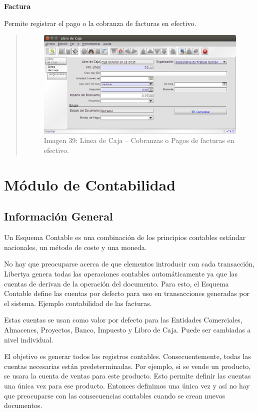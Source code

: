 \documentclass[letterpaper,10pt,spanish]{sphinxmanual}
\begin{document}
\textbf{Factura}

Permite registrar el pago o la cobranza de facturas en efectivo.
\begin{quote}
\begin{figure}[htbp]
\centering
\capstart

\includegraphics{ly_cajas_39.png}
\caption{Imagen 39: Linea de Caja – Cobranzas o Pagos de facturas en efectivo.}\end{figure}
\end{quote}


\chapter{Módulo de Contabilidad}
\label{contabilidad::doc}\label{contabilidad:modulo-de-contabilidad}

\section{Información General}
\label{contabilidad:informacion-general}
Un Esquema Contable es una combinación de los principios contables estándar nacionales, un método de coste y una moneda.

No hay que preocuparse acerca de que elementos introducir con cada transacción,  Libertya genera todas las operaciones contables automáticamente ya que las cuentas de derivan de la operación del documento. Para esto, el Esquema Contable define las cuentas por defecto para uso en transacciones generadas por el sistema. Ejemplo contabilidad de las facturas.

Estas cuentas se usan como valor por defecto para las Entidades Comerciales, Almacenes, Proyectos, Banco, Impuesto y Libro de Caja. Puede ser cambiadas a nivel individual.

El objetivo es generar todos los registros contables. Consecuentemente, todas las
cuentas necesarias están predeterminadas. Por ejemplo, si se vende un producto, se usara la cuenta de ventas para este producto. Esto permite definir las cuentas una única vez para ese producto. Entonces definimos una única vez y así no hay que preocuparse con las consecuencias contables cuando se crean nuevos documentos.
\end{document}
